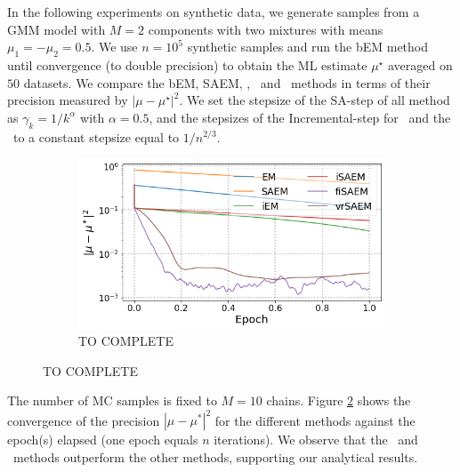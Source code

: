 \documentclass[11pt]{article}
\theoremstyle{t}
\begin{document}
In the following experiments on synthetic data, we generate samples from a GMM model with $M=2$ components with two mixtures with means $\mu_1 = - \mu_2 = 0.5$.
We use $n = 10^5$ synthetic samples and run the bEM method until convergence (to double precision) to obtain the ML estimate $\mu^\star$ averaged on $50$ datasets. We compare the bEM, SAEM, \ISAEM, \SAEMVR\ and \FISAEM\ methods in terms of their precision measured by $| \mu - \mu^\star |^2$. 
We set the stepsize of the \textsf{SA-step} of all method as $\gamma_k = 1/k^{\alpha}$ with $\alpha = 0.5$, and the stepsizes of the \textsf{Incremental-step} for \SAEMVR\ and the \FISAEM\ to a constant stepsize equal to $1/n^{2/3}$. 
\begin{figure}
\begin{minipage}{0.5\textwidth}\vspace{-.9cm}


\begin{figure}[H]
\includegraphics[width=\textwidth]{pic_paper/tts_gmm_n100k.png}\vspace{-.2cm}
\caption{TO COMPLETE}\vspace{-.2cm}
\label{fig:gmm_tts}
\end{figure}

\end{minipage}
\end{figure}

The number of MC samples is fixed to $M=10$ chains.
Figure \ref{fig:gmm_tts} shows the convergence of the precision $|\mu - \mu^*|^2$ for the different methods against the epoch(s) elapsed (one epoch equals $n$ iterations). We observe that the \SAEMVR\ and \FISAEM\ methods outperform the other methods, supporting our analytical results.



\vspace{.2cm}
\end{document}
